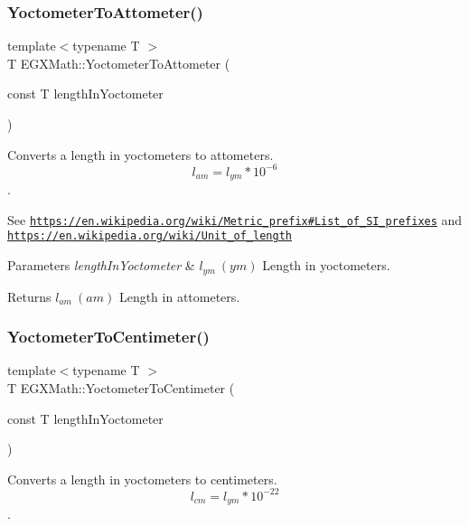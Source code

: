 \subsubsection{\texorpdfstring{Yoctometer\+To\+Attometer()}{YoctometerToAttometer()}}
{\footnotesize\ttfamily template$<$typename T $>$ \\
T E\+G\+X\+Math\+::\+Yoctometer\+To\+Attometer (\begin{DoxyParamCaption}\item[{const T}]{length\+In\+Yoctometer }\end{DoxyParamCaption})}



Converts a length in yoctometers to attometers. \[ l_{am}=l_{ym} * 10^{-6} \]. 

See \href{https://en.wikipedia.org/wiki/Metric_prefix#List_of_SI_prefixes}{\tt https\+://en.\+wikipedia.\+org/wiki/\+Metric\+\_\+prefix\#\+List\+\_\+of\+\_\+\+S\+I\+\_\+prefixes} and \href{https://en.wikipedia.org/wiki/Unit_of_length}{\tt https\+://en.\+wikipedia.\+org/wiki/\+Unit\+\_\+of\+\_\+length} 
\begin{DoxyParams}{Parameters}
{\em length\+In\+Yoctometer} & $ l_{ym}\ (ym)$ Length in yoctometers. \\
\hline
\end{DoxyParams}
\begin{DoxyReturn}{Returns}
$ l_{am}\ (am)$ Length in attometers. 
\end{DoxyReturn}
\mbox{\label{group___e_g_x_math-_conversions-_length_conversions-_s_i-_yoctometer-_s_i_ga38e9c49d57f1e2af4ff3a8cdb460fe7c}} 
\subsubsection{\texorpdfstring{Yoctometer\+To\+Centimeter()}{YoctometerToCentimeter()}}
{\footnotesize\ttfamily template$<$typename T $>$ \\
T E\+G\+X\+Math\+::\+Yoctometer\+To\+Centimeter (\begin{DoxyParamCaption}\item[{const T}]{length\+In\+Yoctometer }\end{DoxyParamCaption})}



Converts a length in yoctometers to centimeters. \[ l_{cm}=l_{ym} * 10^{-22} \]. 

